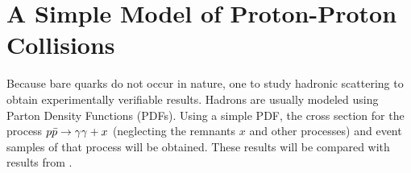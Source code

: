 \chapter{A Simple Model of Proton-Proton Collisions}%
\label{chap:pdf}

Because bare quarks do not occur in nature, one to study hadronic
scattering to obtain experimentally verifiable results. Hadrons are
usually modeled using Parton Density Functions (PDFs). Using a simple
PDF, the cross section for the process \(p\bar{p}\rightarrow\gamma\gamma + x\) (neglecting the
remnants \(x\) and other processes) and event samples of that process
will be obtained. These results will be compared with results from
\sherpa.

